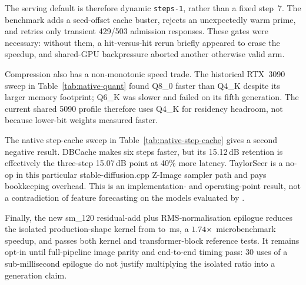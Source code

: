 \documentclass[11pt,a4paper]{article}
\begin{document}
The serving default is therefore dynamic \texttt{steps-1}, rather than a fixed
step~7. The benchmark adds a seed-offset cache buster, rejects an unexpectedly
warm prime, and retries only transient 429/503 admission responses. These gates
were necessary: without them, a hit-versus-hit rerun briefly appeared to erase
the speedup, and shared-GPU backpressure aborted another otherwise valid arm.

Compression also has a non-monotonic speed trade. The historical RTX~3090
sweep in Table~\ref{tab:native-quant} found Q8\_0 faster than Q4\_K despite its
larger memory footprint; Q6\_K was slower and failed on its fifth generation.
The current shared 5090 profile therefore uses Q4\_K for residency headroom,
not because lower-bit weights measured faster.

\begin{table}[H]
\centering
\small

\caption{GGUF quantisation ablation on RTX~3090 at batch 1 and $1024^2$.
Seconds/iteration exclude HTTP and image encoding. Q4\_K saves 2.6\,GiB but is
about 5\% slower than Q8\_0; Q6\_K is neither a speed nor a reliability win.}
\label{tab:native-quant}
\end{table}

The native step-cache sweep in Table~\ref{tab:native-step-cache} gives a second
negative result. DBCache makes six steps faster, but its 15.12\,dB retention is
effectively the three-step 15.07\,dB point at 40\% more latency. TaylorSeer is a
no-op in this particular stable-diffusion.cpp Z-Image sampler path and pays
bookkeeping overhead. This is an implementation- and operating-point result,
not a contradiction of feature forecasting on the models evaluated by
\citet{liu2025taylorseer}.

\begin{table}[H]
\centering
\small

\caption{Native step-cache ablation at $1024^2$ on RTX~3090. Absolute blocks
include thermal drift, so comparisons are confined to the sweep. On this
already-distilled Turbo schedule, three uncached steps dominate six-step
DBCache at nearly the same same-seed retention.}
\label{tab:native-step-cache}
\end{table}

Finally, the new sm\_120 residual-add plus RMS-normalisation epilogue reduces
the isolated production-shape kernel from \FusedResidualTorchMs{} to
\FusedResidualTritonMs{}\,ms, a $1.74\times$ microbenchmark
speedup, and passes both kernel and transformer-block reference tests. It
remains opt-in until full-pipeline image parity and end-to-end timing pass: 30
uses of a sub-millisecond epilogue do not justify multiplying the isolated
ratio into a generation claim.
\end{document}

